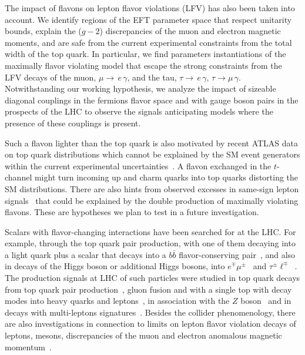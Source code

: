 \documentclass[prd,amsfonts,onecolumn,superscriptaddress,aps,nofootinbib,11pt]{revtex4-1}
\begin{document}
The impact of flavons on lepton flavor violations (LFV) has also been taken into account. We identify regions of the EFT parameter space that respect unitarity bounds, explain the ($g-2$) discrepancies of the muon and electron magnetic moments, and are safe from the current experimental constraints from the total width of the top quark. In particular, we find parameters instantiations of the maximally flavor violating model that escape the strong constraints from the LFV decays of the muon, $\mu\rightarrow\,e\,\gamma$, and the tau, $\tau\rightarrow\,e\,\gamma$, $\tau\rightarrow \mu\,\gamma$. Notwithstanding our working hypothesis, we analyze the impact of sizeable diagonal couplings in the fermions flavor space and with gauge boson pairs in the prospects of the LHC to observe the signals anticipating models where the presence of these couplings is present.

Such a flavon lighter than the top quark is also motivated by recent ATLAS data on top quark distributions which cannot be explained by the SM event generators within the current experimental uncertainties~\cite{ATLAS:2023gsl,Banik:2023vxa}. A flavon exchanged in the $t$-channel might turn incoming up and charm quarks into top quarks distorting the SM distributions.  There are also hints from observed excesses in same-sign lepton signals~\cite{ATLAS:2022xnu} that could be explained by the double production of maximally violating flavons. These are hypotheses we plan to test in a future investigation.

Scalars with flavor-changing interactions have been searched for at the LHC. For example, through the top quark pair production, with one of them decaying into a light quark plus a scalar that decays into a $b\bar{b}$ flavor-conserving pair~\cite{ATLAS:2023mcc}, and also in decays of the Higgs boson or additional Higgs bosons, into $e^\mp\mu^\pm$~\cite{CMS:2023pte} and  $\tau^\pm\ell^\mp$~\cite{ATLAS:2019pmk}.  The production signals at LHC of such particles were studied in top quark decays from top quark pair production~\cite{Carmona:2022jid,Bhattacharyya:2022umc}, gluon fusion and with a single top with decay modes into heavy quarks and leptons~\cite{Tsumura:2009yf}, in association with the $Z$ boson~\cite{Bhattacharyya:2022ciw}  and in decays with multi-leptons signatures~\cite{Hiller:2020fbu,Bissmann:2020lge}. Besides the collider phenomenology, there are also investigations in connection to limits on lepton flavor violation decays of leptons, mesons, discrepancies of the muon and electron anomalous magnetic momentum~\cite{Cornella:2019uxs,Bauer:2019gfk,Carmona:2021seb,Muong-2:2006rrc,Muong-2:2015xgu,Muong-2:2023cdq,Hanneke_2008,Hanneke:2010au}. 
\end{document}
